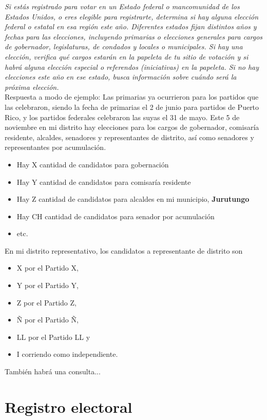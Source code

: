 \documentclass[11pt]{article} %
\begin{document}
\textit{Si estás registrado para votar en un Estado federal o mancomunidad de los Estados Unidos, o eres elegible para registrarte, determina si hay alguna elección federal o estatal en esa región este año. Diferentes estados fijan distintos años y fechas para las elecciones, incluyendo primarias o elecciones generales para cargos de gobernador, legislaturas, de condados y locales o municipales. Si hay una elección, verifica qué cargos estarán en la papeleta de tu sitio de votación y si habrá alguna elección especial o referendos (iniciativas) en la papeleta. Si no hay elecciones este año en ese estado, busca información sobre cuándo será la próxima elección.}
\\
Respuesta a modo de ejemplo: Las primarias ya ocurrieron para los partidos que las celebraron, siendo la fecha de primarias el 2 de junio para partidos de Puerto Rico, y los partidos federales celebraron las suyas el 31 de mayo. Este 5 de noviembre en mi distrito hay elecciones para los cargos de gobernador, comisaría residente, alcaldes, senadores y representantes de distrito, así como senadores y representantes por acumulación. 
\begin{itemize}
    \item Hay X cantidad de candidatos para gobernación
    \item Hay Y cantidad de candidatos para comisaría residente
    \item Hay Z cantidad de candidatos para alcaldes en mi municipio, \textbf{Jurutungo}
    \item Hay CH cantidad de candidatos para senador por acumulación
    \item etc.
\end{itemize}

En mi distrito representativo, los candidatos a representante de distrito son 

\begin{itemize}
    \item X por el Partido X, 
    \item Y por el Partido Y, 
    \item Z por el Partido Z, 
    \item Ñ por el Partido Ñ, 
    \item LL por el Partido LL y
    \item I corriendo como independiente.
\end{itemize}

También habrá una consulta... 

\section{Registro electoral}
\end{document}
